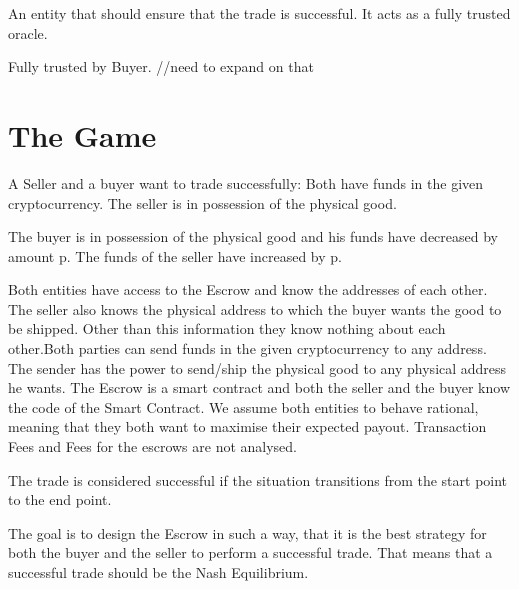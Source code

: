 \documentclass{cacthesis}
\begin{document}
 An entity that should ensure that the trade is successful. It acts as a fully trusted oracle.

 Fully trusted by Buyer.  //need to expand on that

\section{The Game}

A Seller and a buyer want to trade successfully: Both have funds in the given cryptocurrency. The seller is in possession of the physical good.

The buyer is in possession of the physical good and his funds have decreased by amount p. The funds of the seller have increased by p.

Both entities have access to the Escrow and know the addresses of each other. The seller also knows the physical address to which the buyer wants the good to be shipped. Other than this information they know nothing about each other.\newline Both parties can send funds in the given cryptocurrency to any address. The sender has the power to send/ship the physical good to any physical address he wants. The Escrow is a smart contract and both the seller and the buyer know the code of the Smart Contract.\newline
We assume both entities to behave rational, meaning that they both want to maximise their expected payout.\newline
Transaction Fees and Fees for the escrows are not analysed.



The trade is considered successful if the situation transitions from the start point to the end point.

The goal is to design the Escrow in such a way, that it is the best strategy for both the buyer and the seller to perform a successful trade. That means that a successful trade should be the Nash Equilibrium.

\end{document}
